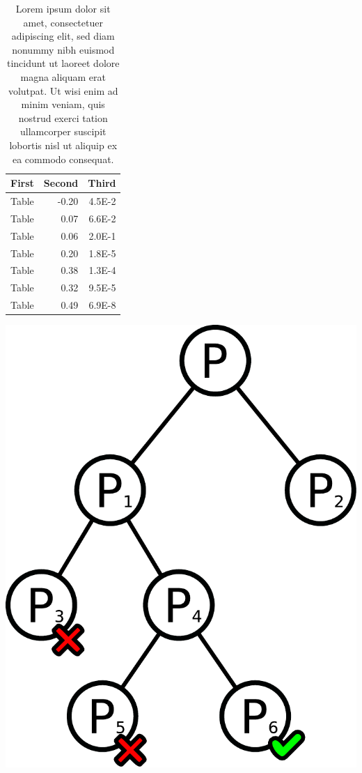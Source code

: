 \begin{table}[!htb]
	\begin{minipage}{0.45\textwidth}
		\centering
		\footnotesize
		\begin{tabular}{lrr}
			 \hline
    	 \textbf{First} & \textbf{Second} & \textbf{Third} \\
    	 \hline
			Table & -0.20  & 4.5E-2 \\
			Table & 0.07 & 6.6E-2 \\
			Table & 0.06 & 2.0E-1 \\
			Table & 0.20 & 1.8E-5 \\
			Table & 0.38 & 1.3E-4 \\
			Table & 0.32 & 9.5E-5 \\
			Table & 0.49 & 6.9E-8 \\
			\hline
  	\end{tabular}
  	\normalsize
	\end{minipage} \hfill
	\begin{minipage}{0.54\textwidth}
		\centering
		\includegraphics[width=0.5\linewidth]{figures/samples/sample2}
	\end{minipage}
	\caption[Some short caption]{Lorem ipsum dolor sit amet, consectetuer adipiscing elit, sed diam nonummy nibh euismod tincidunt ut laoreet dolore magna aliquam erat volutpat. Ut wisi enim ad minim veniam, quis nostrud exerci tation ullamcorper suscipit lobortis nisl ut aliquip ex ea commodo consequat.}
	\label{tab:imprwd_params}
\end{table}


